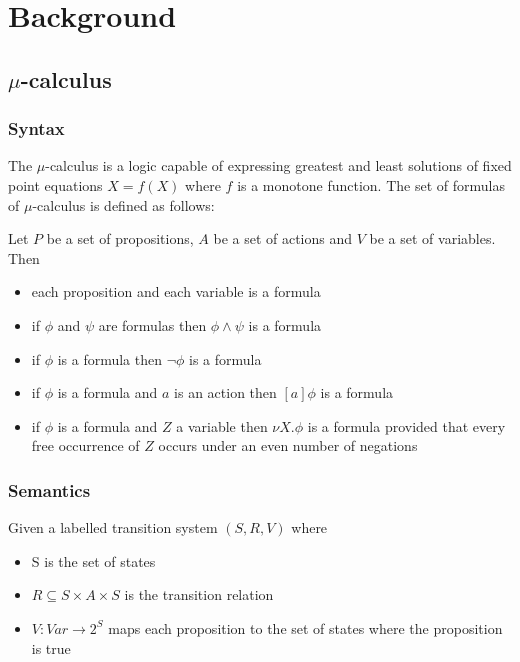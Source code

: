 \chapter{Background}

\section{$\mu$-calculus}

\subsection{Syntax}

The $\mu$-calculus is a logic capable of expressing greatest and least solutions of fixed point equations $X = f(X)$ where $f$ is a monotone function. The set of formulas of $\mu$-calculus is defined as follows:

Let $P$ be a set of propositions, $A$ be a set of actions and $V$ be a set of variables. Then
\begin{itemize}
    \item each proposition and each variable is a formula
    \item if $\phi$ and $\psi$ are formulas then $\phi \wedge \psi$ is a formula
    \item if $\phi$ is a formula then $\neg \phi$ is a formula
    \item if $\phi$ is a formula and $a$ is an action then $[a]\phi$ is a formula
    \item if $\phi$ is a formula and $Z$ a variable then $\nu X.\phi$ is a formula provided that every free occurrence of $Z$ occurs under an even number of negations
\end{itemize}

\subsection{Semantics}

Given a labelled transition system $(S, R, V)$ where
\begin{itemize}
    \item S is the set of states
    \item $R \subseteq S \times A \times S$ is the transition relation
    \item $V : Var \rightarrow 2^S$ maps each proposition to the set of states where the proposition is true
\end{itemize}

